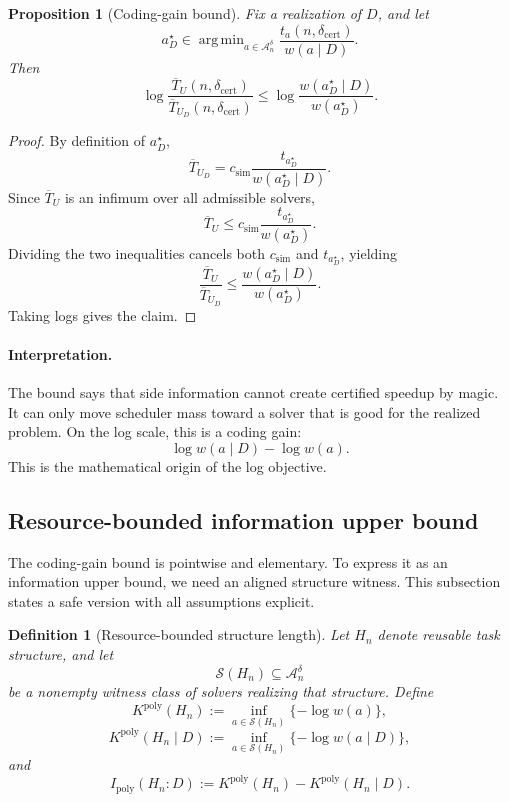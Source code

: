 \documentclass{article}
\newtheorem{definition}{Definition}
\newtheorem{proposition}{Proposition}
\DeclareMathOperator*{\argmin}{arg\,min}
\newcommand{\cA}{\mathcal{A}}
\newcommand{\cS}{\mathcal{S}}
\begin{document}
\begin{proposition}[Coding-gain bound]
\label{prop:app-coding-gain}
Fix a realization of \(D\), and let
\[
    a_D^\star
    \in
    \argmin_{a\in\cA_n^\delta}
    \frac{t_a(n,\delta_{\mathrm{cert}})}{w(a\mid D)}.
\]
Then
\[
    \log\frac{\overline T_U(n,\delta_{\mathrm{cert}})}
             {\overline T_{U_D}(n,\delta_{\mathrm{cert}})}
    \le
    \log\frac{w(a_D^\star\mid D)}{w(a_D^\star)}.
\]
\end{proposition}

\begin{proof}
By definition of \(a_D^\star\),
\[
    \overline T_{U_D}
    =
    c_{\mathrm{sim}}
    \frac{t_{a_D^\star}}{w(a_D^\star\mid D)}.
\]
Since \(\overline T_U\) is an infimum over all admissible solvers,
\[
    \overline T_U
    \le
    c_{\mathrm{sim}}
    \frac{t_{a_D^\star}}{w(a_D^\star)}.
\]
Dividing the two inequalities cancels both \(c_{\mathrm{sim}}\) and \(t_{a_D^\star}\), yielding
\[
    \frac{\overline T_U}{\overline T_{U_D}}
    \le
    \frac{w(a_D^\star\mid D)}{w(a_D^\star)}.
\]
Taking logs gives the claim.
\end{proof}

\paragraph{Interpretation.}
The bound says that side information cannot create certified speedup by magic.
It can only move scheduler mass toward a solver that is good for the realized problem.
On the log scale, this is a coding gain:
\[
    \log w(a\mid D)-\log w(a).
\]
This is the mathematical origin of the log objective.

\subsection{Resource-bounded information upper bound}

The coding-gain bound is pointwise and elementary.
To express it as an information upper bound, we need an aligned structure witness.
This subsection states a safe version with all assumptions explicit.

\begin{definition}[Resource-bounded structure length]
\label{def:app-ipoly}
Let \(H_n\) denote reusable task structure, and let
\[
    \cS(H_n)\subseteq\cA_n^\delta
\]
be a nonempty witness class of solvers realizing that structure.
Define
\[
    K^{\mathrm{poly}}(H_n)
    :=
    \inf_{a\in\cS(H_n)}\{-\log w(a)\},
\]
\[
    K^{\mathrm{poly}}(H_n\mid D)
    :=
    \inf_{a\in\cS(H_n)}\{-\log w(a\mid D)\},
\]
and
\[
    I_{\mathrm{poly}}(H_n:D)
    :=
    K^{\mathrm{poly}}(H_n)
    -
    K^{\mathrm{poly}}(H_n\mid D).
\]
\end{definition}
\end{document}
